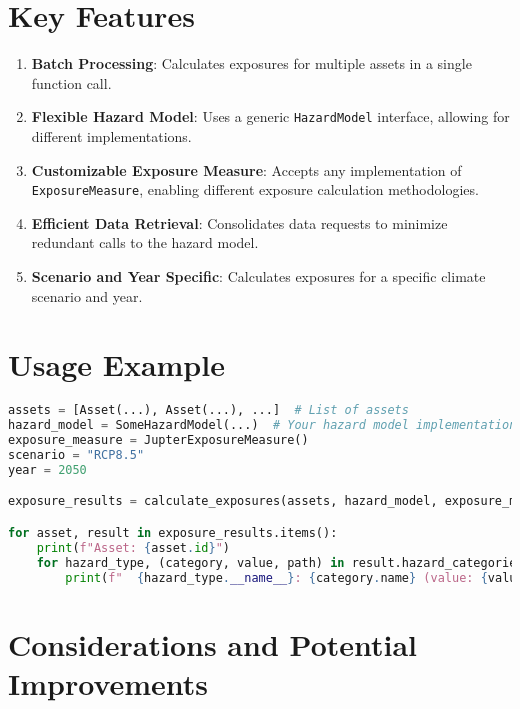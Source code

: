 \documentclass{article}
\begin{document}
\section{Key Features}

\begin{enumerate}
    \item \textbf{Batch Processing}: Calculates exposures for multiple assets in a single function call.

    \item \textbf{Flexible Hazard Model}: Uses a generic \texttt{HazardModel} interface, allowing for different implementations.

    \item \textbf{Customizable Exposure Measure}: Accepts any implementation of \texttt{ExposureMeasure}, enabling different exposure calculation methodologies.

    \item \textbf{Efficient Data Retrieval}: Consolidates data requests to minimize redundant calls to the hazard model.

    \item \textbf{Scenario and Year Specific}: Calculates exposures for a specific climate scenario and year.
\end{enumerate}

\section{Usage Example}

\begin{lstlisting}[language=Python]
assets = [Asset(...), Asset(...), ...]  # List of assets
hazard_model = SomeHazardModel(...)  # Your hazard model implementation
exposure_measure = JupterExposureMeasure()
scenario = "RCP8.5"
year = 2050

exposure_results = calculate_exposures(assets, hazard_model, exposure_measure, scenario, year)

for asset, result in exposure_results.items():
    print(f"Asset: {asset.id}")
    for hazard_type, (category, value, path) in result.hazard_categories.items():
        print(f"  {hazard_type.__name__}: {category.name} (value: {value}, source: {path})")
\end{lstlisting}

\section{Considerations and Potential Improvements}
\end{document}
